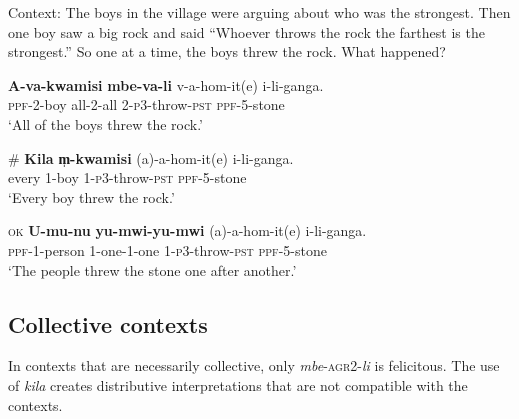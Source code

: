 \documentclass[output=paper,modfonts,nonflat]{langsci/langscibook}
\begin{document}
\begin{exe}
\ex Context: The boys in the village were arguing about who was the strongest. Then one boy saw a big rock and said ``Whoever throws the rock the farthest is the strongest.'' So one at a time, the boys threw the rock. What happened?   \label{ex:kaspercushman:stone}

\begin{xlist}

\ex 
\gll \textbf{A-va-kwamisi} \textbf{mbe-va-li} v-a-hom-it(e) i-li-ganga. \\
\textsc{ppf}-2-boy all-2-all 2-\textsc{p3}-throw-\textsc{pst} \textsc{ppf}-5-stone \\
\glt `All of the boys threw the rock.'




\ex 
\gll \# \textbf{Kila} \textbf{m̩-kwamisi} (a)-a-hom-it(e) i-li-ganga. \\
{} every 1-boy 1-\textsc{p3}-throw-\textsc{pst} \textsc{ppf}-5-stone \\ \label{ex:kaspercushman:reduplicationstone}
\glt `Every boy threw the rock.'




\ex 
\gll \textsc{ok} \textbf{U-mu-nu} \textbf{yu-mwi-yu-mwi} (a)-a-hom-it(e) i-li-ganga.\\  
{} \textsc{ppf}-1-person 1-one-1-one 1-\textsc{p3}-throw-\textsc{pst} \textsc{ppf}-5-stone \\
\glt `The people threw the stone one after another.'

\end{xlist}
\end{exe}


\subsection{Collective contexts}

In contexts that are necessarily collective, only \textit{mbe}-\textsc{agr2}-\textit{li} is felicitous.  The use of \textit{kila} creates distributive interpretations that are not compatible with the contexts. 
\end{document}
